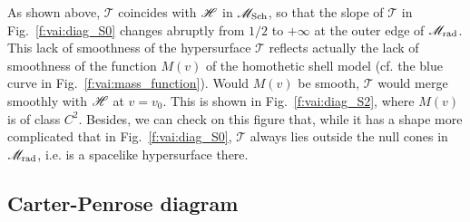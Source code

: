 \begin{remark}
As shown above, $\mathscr{T}$ coincides with $\mathscr{H}$ in $\mathscr{M}_{\rm Sch}$, so that
the slope of $\mathscr{T}$ in Fig.~\ref{f:vai:diag_S0} changes abruptly from $1/2$
to $+\infty$ at the outer edge of $\mathscr{M}_{\rm rad}$.
This lack of smoothness of the hypersurface $\mathscr{T}$ reflects actually
the lack of smoothness of the function $M(v)$ of the homothetic shell model
(cf. the blue curve in Fig.~\ref{f:vai:mass_function}). Would $M(v)$ be smooth,
$\mathscr{T}$ would merge smoothly with $\mathscr{H}$ at $v=v_0$. This is shown in
Fig.~\ref{f:vai:diag_S2}, where $M(v)$ is of class $C^2$. Besides, we can check
on this figure that, while it has a shape more complicated
that in Fig.~\ref{f:vai:diag_S0}, $\mathscr{T}$ always lies outside the null cones in
$\mathscr{M}_{\rm rad}$, i.e. is a spacelike hypersurface there.
\end{remark}

\subsection{Carter-Penrose diagram} \label{f:vai:thin_CP}

